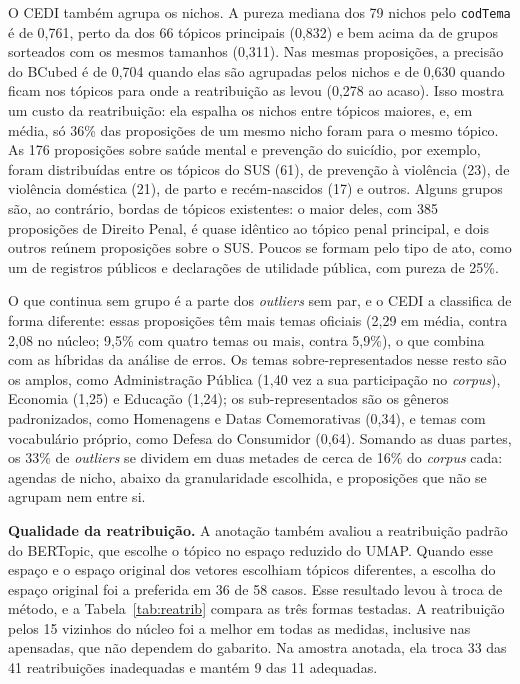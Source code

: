 O CEDI também agrupa os nichos. A pureza mediana dos 79 nichos pelo \texttt{codTema} é de 0,761, perto da dos 66 tópicos principais (0,832) e bem acima da de grupos sorteados com os mesmos tamanhos (0,311). Nas mesmas proposições, a precisão do BCubed é de 0,704 quando elas são agrupadas pelos nichos e de 0,630 quando ficam nos tópicos para onde a reatribuição as levou (0,278 ao acaso). Isso mostra um custo da reatribuição: ela espalha os nichos entre tópicos maiores, e, em média, só 36\% das proposições de um mesmo nicho foram para o mesmo tópico. As 176 proposições sobre saúde mental e prevenção do suicídio, por exemplo, foram distribuídas entre os tópicos do SUS (61), de prevenção à violência (23), de violência doméstica (21), de parto e recém-nascidos (17) e outros. Alguns grupos são, ao contrário, bordas de tópicos existentes: o maior deles, com 385 proposições de Direito Penal, é quase idêntico ao tópico penal principal, e dois outros reúnem proposições sobre o SUS. Poucos se formam pelo tipo de ato, como um de registros públicos e declarações de utilidade pública, com pureza de 25\%.

O que continua sem grupo é a parte dos \textit{outliers} sem par, e o CEDI a classifica de forma diferente: essas proposições têm mais temas oficiais (2,29 em média, contra 2,08 no núcleo; 9,5\% com quatro temas ou mais, contra 5,9\%), o que combina com as híbridas da análise de erros. Os temas sobre-representados nesse resto são os amplos, como Administração Pública (1,40 vez a sua participação no \textit{corpus}), Economia (1,25) e Educação (1,24); os sub-representados são os gêneros padronizados, como Homenagens e Datas Comemorativas (0,34), e temas com vocabulário próprio, como Defesa do Consumidor (0,64). Somando as duas partes, os 33\% de \textit{outliers} se dividem em duas metades de cerca de 16\% do \textit{corpus} cada: agendas de nicho, abaixo da granularidade escolhida, e proposições que não se agrupam nem entre si.

\textbf{Qualidade da reatribuição.} A anotação também avaliou a reatribuição padrão do BERTopic, que escolhe o tópico no espaço reduzido do UMAP. Quando esse espaço e o espaço original dos vetores escolhiam tópicos diferentes, a escolha do espaço original foi a preferida em 36 de 58 casos. Esse resultado levou à troca de método, e a Tabela~\ref{tab:reatrib} compara as três formas testadas. A reatribuição pelos 15 vizinhos do núcleo foi a melhor em todas as medidas, inclusive nas apensadas, que não dependem do gabarito. Na amostra anotada, ela troca 33 das 41 reatribuições inadequadas e mantém 9 das 11 adequadas.

